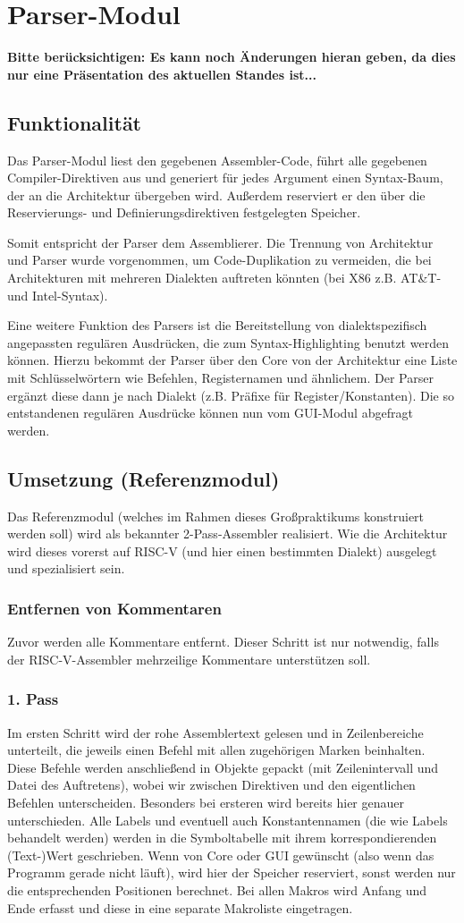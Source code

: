 \documentclass[a4paper]{article}
\begin{document}
\section{Parser-Modul}
\textbf{Bitte berücksichtigen: Es kann noch Änderungen hieran geben, da dies nur eine Präsentation des aktuellen Standes ist...}
\subsection{Funktionalität}
Das Parser-Modul liest den gegebenen Assembler-Code,
führt alle gegebenen Compiler-Direktiven aus und generiert für jedes Argument einen Syntax-Baum,
der an die Architektur übergeben wird.
Außerdem reserviert er den über die Reservierungs- und Definierungsdirektiven festgelegten Speicher.

Somit entspricht der Parser dem Assemblierer.
Die Trennung von Architektur und Parser wurde vorgenommen,
um Code-Duplikation zu vermeiden,
die bei Architekturen mit mehreren Dialekten auftreten könnten (bei X86 z.B. AT\&T- und Intel-Syntax).

Eine weitere Funktion des Parsers ist die Bereitstellung von dialektspezifisch angepassten regulären Ausdrücken, die zum Syntax-Highlighting benutzt werden können. Hierzu bekommt der Parser über den Core von der Architektur eine Liste mit Schlüsselwörtern wie Befehlen, Registernamen und ähnlichem. Der Parser ergänzt diese dann je nach Dialekt (z.B. Präfixe für Register/Konstanten). Die so entstandenen regulären Ausdrücke können nun vom GUI-Modul abgefragt werden.
\subsection{Umsetzung (Referenzmodul)}
Das Referenzmodul (welches im Rahmen dieses Großpraktikums konstruiert werden soll) wird als bekannter 2-Pass-Assembler realisiert. Wie die Architektur wird dieses vorerst auf RISC-V (und hier einen bestimmten Dialekt) ausgelegt und spezialisiert sein.
\subsubsection{Entfernen von Kommentaren}
Zuvor werden alle Kommentare entfernt. Dieser Schritt ist nur notwendig, falls der RISC-V-Assembler mehrzeilige Kommentare unterstützen soll.
\subsubsection{1. Pass}
Im ersten Schritt wird der rohe Assemblertext gelesen und in Zeilenbereiche unterteilt, die jeweils einen Befehl mit allen zugehörigen Marken beinhalten.
Diese Befehle werden anschließend in Objekte gepackt (mit Zeilenintervall und Datei des Auftretens), wobei wir zwischen Direktiven und den eigentlichen Befehlen unterscheiden.
Besonders bei ersteren wird bereits hier genauer unterschieden.
Alle Labels und eventuell auch Konstantennamen (die wie Labels behandelt werden) werden in die Symboltabelle mit ihrem korrespondierenden (Text-)Wert geschrieben.
Wenn von Core oder GUI gewünscht (also wenn das Programm gerade nicht läuft), wird hier der Speicher reserviert, sonst werden nur die entsprechenden Positionen berechnet.
Bei allen Makros wird Anfang und Ende erfasst und diese in eine separate Makroliste eingetragen.
\end{document}
